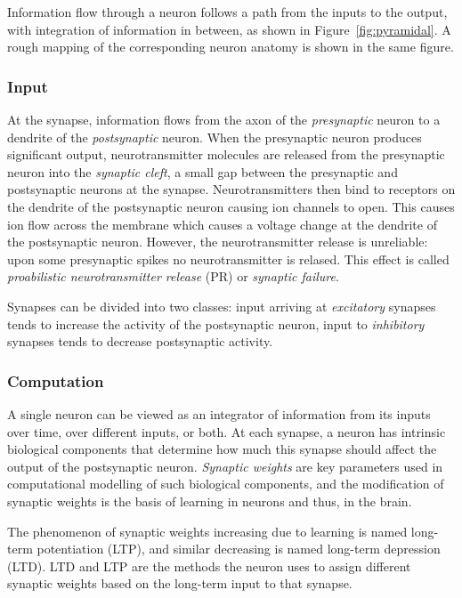 \documentclass[a4paper,12pt]{report}
\theoremstyle{definition}
\begin{document}
Information flow through a neuron follows a path from the inputs to the output, with integration of information in between, as shown in Figure~\ref{fig:pyramidal}. A rough mapping of the corresponding neuron anatomy is shown in the same figure.


\subsubsection{Input}

At the synapse, information flows from the axon of the \emph{presynaptic} neuron to a dendrite of the \emph{postsynaptic} neuron. When the presynaptic neuron produces significant output, neurotransmitter molecules are released from the presynaptic neuron into the \emph{synaptic cleft}, a small gap between the presynaptic and postsynaptic neurons at the synapse.
Neurotransmitters then bind to receptors on the dendrite of the postsynaptic neuron causing ion channels to open. This causes ion flow across the membrane which causes a voltage change at the dendrite of the postsynaptic neuron. However, the neurotransmitter release is unreliable: upon some presynaptic spikes no neurotransmitter is relased. This effect is called \emph{proabilistic neurotransmitter release} (PR) or \emph{synaptic failure}.

Synapses can be divided into two classes: input arriving at \emph{excitatory} synapses tends to increase the activity of the postsynaptic neuron, input to \emph{inhibitory} synapses tends to decrease postsynaptic activity.

\subsubsection{Computation}
A single neuron can be viewed as an integrator of information from its inputs over time, over different inputs, or both. At each synapse, a neuron has intrinsic biological components that determine how much this synapse should affect the output of the postsynaptic neuron. \emph{Synaptic weights} are key parameters used in computational modelling of such biological components, and the modification of synaptic weights is the basis of learning in neurons and thus, in the brain.

The phenomenon of synaptic weights increasing due to learning is named long-term potentiation (LTP), and similar decreasing is named long-term depression (LTD). LTD and LTP are the methods the neuron uses to assign different synaptic weights based on the long-term input to that synapse.
\end{document}
